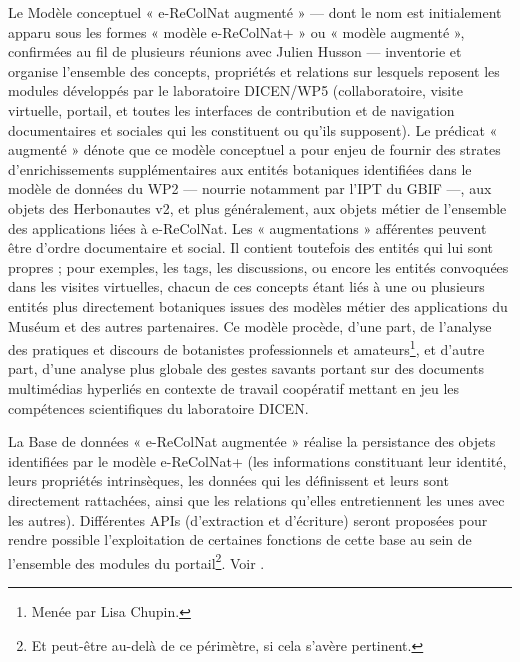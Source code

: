 \startchapter[title={Terminologie}]

\startsection[title={Le modèle « e-RecolNat+ »}]

Le Modèle conceptuel « e-ReColNat augmenté » --- dont le nom est initialement apparu sous les formes « modèle e-ReColNat+ » ou « modèle augmenté », confirmées au fil de plusieurs réunions avec Julien Husson --- inventorie et organise l'ensemble des concepts, propriétés et relations sur lesquels reposent les modules développés par le laboratoire DICEN/WP5 (collaboratoire, visite virtuelle, portail, et toutes les interfaces de contribution et de navigation documentaires et sociales qui les constituent ou qu'ils supposent).
Le prédicat « augmenté » dénote que ce modèle conceptuel a pour enjeu de fournir des strates d'enrichissements supplémentaires aux entités botaniques identifiées dans le modèle de données du WP2 --- nourrie notamment par l'IPT du GBIF ---, aux objets des Herbonautes v2, et plus généralement, aux objets métier de l'ensemble des applications liées à e-ReColNat.
Les « augmentations » afférentes peuvent être d'ordre documentaire et social.
Il contient toutefois des entités qui lui sont propres ; pour exemples, les tags, les discussions, ou encore les entités convoquées dans les visites virtuelles, chacun de ces concepts étant liés à une ou plusieurs entités plus directement botaniques issues des modèles métier des applications du Muséum et des autres partenaires.
Ce modèle procède, d'une part, de l'analyse des pratiques et discours de botanistes professionnels et amateurs\footnote{Menée par Lisa Chupin.}, et d'autre part, d'une analyse plus globale des gestes savants portant sur des documents multimédias hyperliés en contexte de travail coopératif mettant en jeu les compétences scientifiques du laboratoire DICEN.

\stopsection
\startsection[title={La base « e-ReColNat+ »},reference=terme:base]

La Base de données « e-ReColNat augmentée » réalise la persistance des objets identifiées par le modèle e-ReColNat+ (les informations constituant leur identité, leurs propriétés intrinsèques, les données qui les définissent et leurs sont directement rattachées, ainsi que les relations qu'elles entretiennent les unes avec les autres).
Différentes APIs (d'extraction et d'écriture) seront proposées pour rendre possible l'exploitation de certaines fonctions de cette base au sein de l'ensemble des modules du portail\footnote{Et peut-être au-delà de ce périmètre, si cela s'avère pertinent.}.
Voir .

\stopsection
\stopchapter